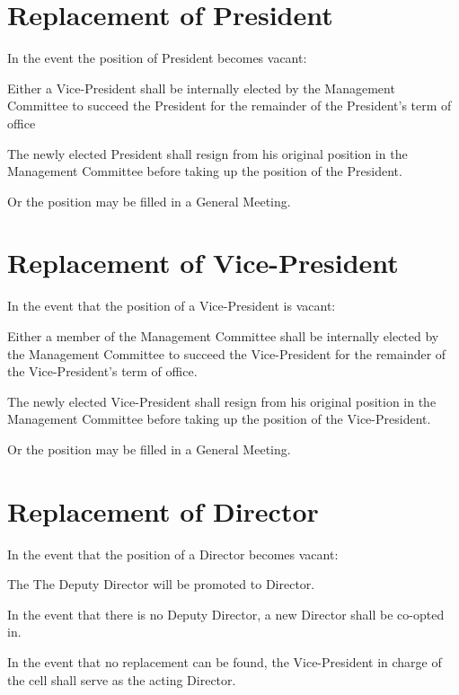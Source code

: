 \section{Replacement of President}
In the event the position of President becomes vacant:
	\begin{legal}
	\item Either a Vice-President shall be internally elected by the Management Committee to succeed the President for the remainder of the President's term of office
		\begin{legal}
		\item The newly elected President shall resign from his original position in the Management Committee before taking up the position of the President.
		\end{legal}
	\item Or the position may be filled in a General Meeting.
	\end{legal}

\section{Replacement of Vice-President}
In the event that the position of a Vice-President is vacant:
	\begin{legal}
	\item Either a member of the Management Committee shall be internally elected by the Management Committee to succeed the Vice-President for the remainder of the Vice-President's term of office.
	\begin{legal}
		\item The newly elected Vice-President shall resign from his original position in the Management Committee before taking up the position of the Vice-President.
	\end{legal}
	\item Or the position may be filled in a General Meeting.
	\end{legal}

\section{Replacement of Director}
In the event that the position of a Director becomes vacant:
	\begin{legal}
	\item The The Deputy Director will be promoted to Director.
	\item In the event that there is no Deputy Director, a new Director shall be co-opted in.
	\item In the event that no replacement can be found, the Vice-President in charge of the cell shall serve as the acting Director.
	\end{legal}

